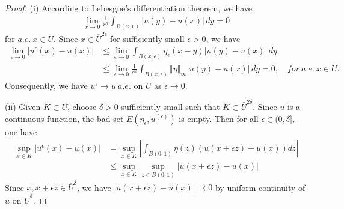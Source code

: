 \documentclass{article}
\numberwithin{equation}{section}
\theoremstyle{plain}
\theoremstyle{definition}
\begin{document}
\begin{proof}
(i) According to Lebesgue's differentiation theorem, we have
\begin{align*}
	\lim_{r\to 0}\frac{1}{r^n}\int_{B(x,r)}\vert u(y)-u(x)\vert\,dy=0
\end{align*}
for $a.e.\ x\in U$. Since $x\in\overline{U}^{2\epsilon}$ for sufficiently small $\epsilon>0$, we have
\begin{align*}
	\lim_{\epsilon\to 0}\vert u^\epsilon(x)-u(x)\vert&\leq \lim_{\epsilon\to 0}\int_{B(x,\epsilon)}\eta_\epsilon(x-y)\vert u(y)-u(x)\vert\,dy\\
	&\leq\lim_{\epsilon\to 0}\frac{1}{\epsilon^n}\int_{B(x,\epsilon)}\Vert\eta\Vert_\infty\vert u(y)-u(x)\vert\,dy = 0,\quad for\ a.e.\ x\in U.
\end{align*}
Consequently, we have $u^\epsilon\to u\ a.e.$ on $U$ as $\epsilon\to 0$.

(ii) Given $K\subset U$, choose $\delta>0$ sufficiently small such that $K\subset\overline{U}^{2\delta}$. Since $u$ is a continuous function, the bad set $E(\eta_\epsilon,\overline{u}^{(\epsilon)})$ is empty. Then for all $\epsilon\in(0,\delta]$, one have
\begin{align*}
	\sup_{x\in K}\vert u^\epsilon(x)-u(x)\vert&=\sup_{x\in K}\left\vert\int_{B(0,1)}\eta(z)\left(u(x+\epsilon z)-u(x)\right)dz\right\vert\\
	&\leq\sup_{x\in K}\sup_{z\in B(0,1)}\left\vert u(x+\epsilon z)-u(x)\right\vert
\end{align*}
Since $x,x+\epsilon z\in\overline{U}^\delta$, we have $\left\vert u(x+\epsilon z)-u(x)\right\vert\rightrightarrows 0$ by uniform continuity of $u$ on $\overline{U}^\delta$.


\end{proof}
\end{document}
